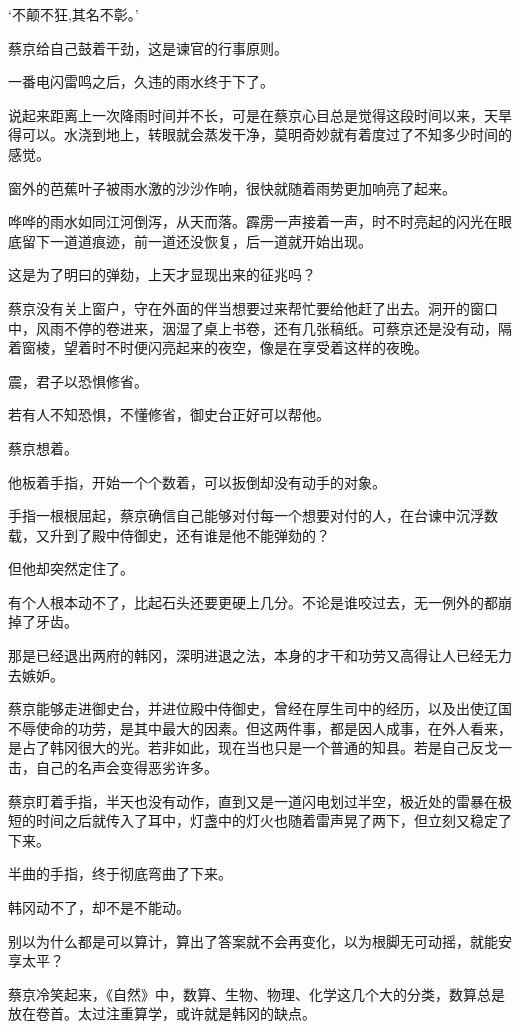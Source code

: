 ‘不颠不狂,其名不彰。’

蔡京给自己鼓着干劲，这是谏官的行事原则。

一番电闪雷鸣之后，久违的雨水终于下了。

说起来距离上一次降雨时间并不长，可是在蔡京心目总是觉得这段时间以来，天旱得可以。水浇到地上，转眼就会蒸发干净，莫明奇妙就有着度过了不知多少时间的感觉。

窗外的芭蕉叶子被雨水激的沙沙作响，很快就随着雨势更加响亮了起来。

哗哗的雨水如同江河倒泻，从天而落。霹雳一声接着一声，时不时亮起的闪光在眼底留下一道道痕迹，前一道还没恢复，后一道就开始出现。

这是为了明曰的弹劾，上天才显现出来的征兆吗？

蔡京没有关上窗户，守在外面的伴当想要过来帮忙要给他赶了出去。洞开的窗口中，风雨不停的卷进来，洇湿了桌上书卷，还有几张稿纸。可蔡京还是没有动，隔着窗棱，望着时不时便闪亮起来的夜空，像是在享受着这样的夜晚。

震，君子以恐惧修省。

若有人不知恐惧，不懂修省，御史台正好可以帮他。

蔡京想着。

他板着手指，开始一个个数着，可以扳倒却没有动手的对象。

手指一根根屈起，蔡京确信自己能够对付每一个想要对付的人，在台谏中沉浮数载，又升到了殿中侍御史，还有谁是他不能弹劾的？

但他却突然定住了。

有个人根本动不了，比起石头还要更硬上几分。不论是谁咬过去，无一例外的都崩掉了牙齿。

那是已经退出两府的韩冈，深明进退之法，本身的才干和功劳又高得让人已经无力去嫉妒。

蔡京能够走进御史台，并进位殿中侍御史，曾经在厚生司中的经历，以及出使辽国不辱使命的功劳，是其中最大的因素。但这两件事，都是因人成事，在外人看来，是占了韩冈很大的光。若非如此，现在当也只是一个普通的知县。若是自己反戈一击，自己的名声会变得恶劣许多。

蔡京盯着手指，半天也没有动作，直到又是一道闪电划过半空，极近处的雷暴在极短的时间之后就传入了耳中，灯盏中的灯火也随着雷声晃了两下，但立刻又稳定了下来。

半曲的手指，终于彻底弯曲了下来。

韩冈动不了，却不是不能动。

别以为什么都是可以算计，算出了答案就不会再变化，以为根脚无可动摇，就能安享太平？

蔡京冷笑起来，《自然》中，数算、生物、物理、化学这几个大的分类，数算总是放在卷首。太过注重算学，或许就是韩冈的缺点。

